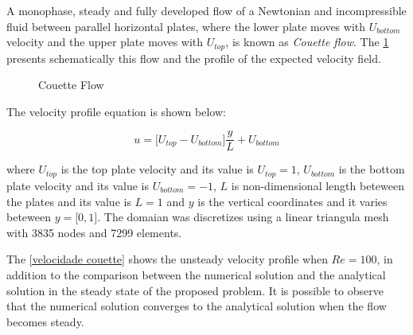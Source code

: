 A monophase, steady and fully developed flow of a 
Newtonian and incompressible fluid between parallel horizontal 
plates, where the lower plate moves with \textit{$U_{bottom}$} 
velocity and the upper plate moves with \textit{$ U_{top}$}, 
is known as \textit{Couette flow}. The \ref{couette}
 presents schematically this flow and the profile of the expected velocity field.

\begin{figure}[H]
\begin{center}
\end{center}
\caption{Couette Flow}
\label{couette}
\end{figure}


\noindent
The velocity profile equation is shown below:

\begin{equation}
 u = \big[ U_{top} - U_{bottom} \big] \frac{y}{L} + U_{bottom}
\end{equation}

\medskip
\noindent
where $U_{top}$ is the top plate velocity and its value is
$U_{top} = 1$, 
$U_{bottom}$ is the bottom plate velocity and its value is
$U_{bottom} = -1$, 
$L$ is non-dimensional length
beteween the plates and its value is $L = 1$
and $y$ is the vertical coordinates and it varies beteween 
$y = \big[ 0,1 \big]$.
The domaian was discretizes using a linear triangula mesh with 
3835 nodes and 7299 elements. 

\bigskip
The \ref{velocidade couette} shows the unsteady velocity profile
when $Re=100$, in addition to the comparison between 
the numerical solution and the analytical solution 
in the steady state of the proposed problem. 
It is possible to observe that the numerical solution 
converges to the analytical solution when the flow becomes steady.

